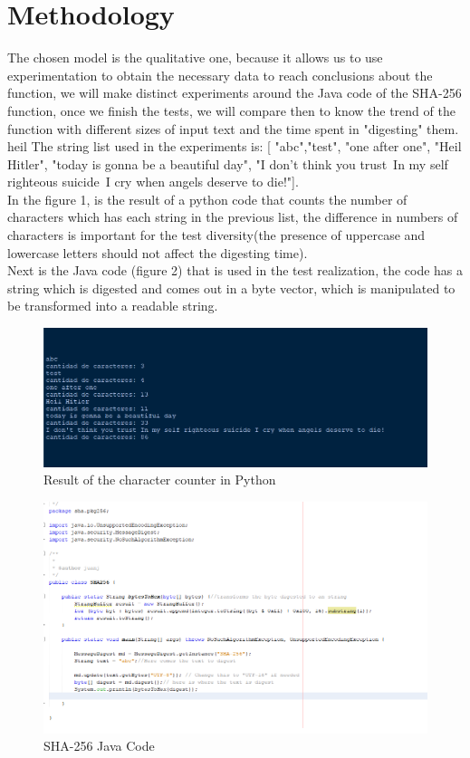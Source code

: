 \documentclass[journal]{IEEEtran}
\begin{document}
\section{Methodology}
The chosen model is the qualitative one, because it allows us to use experimentation to obtain the necessary data to reach conclusions about the function, we will make distinct experiments around the Java code of the SHA-256 function, once we finish the tests, we will compare then to know the trend of the function with different sizes of input text and the time spent in "digesting" them.\\heil 
The string list used in the experiments is:
[ "abc","test", "one after one", "Heil Hitler", "today is gonna be a beautiful day", "I don't think you trust\ In my self righteous suicide\ I cry when angels deserve to die!"].\\
In the figure 1, is the result of a python code that counts the number of characters which has each string in the previous list, the difference in numbers of characters is important for the test diversity(the presence of uppercase and lowercase letters should not affect the digesting time). \\
 Next is the Java code (figure 2) that is used in the test realization, the code has a string which is digested and comes out in a byte vector, which is manipulated to be transformed into a readable string.
\begin{figure}[h] 
	\centering \includegraphics[width=.70\columnwidth]{CantidadDeCaracteres.png}
	\caption{
		\label{fig:samplesetup}
		Result of the character counter in Python
	}
\end{figure}
\begin{figure}[h] 
	\centering \includegraphics[width=.70\columnwidth]{Sha-256Code.png}
	\caption{
		\label{fig:samplesetup}
		SHA-256 Java Code 
	}
\end{figure}
\end{document}
